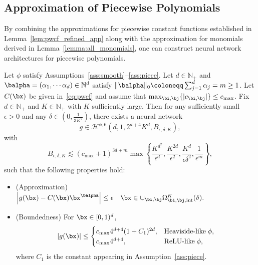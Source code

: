 \documentclass[11pt]{article}
\begin{document}
\subsection{Approximation of Piecewise Polynomials}
\label{subsec:piecewise-monomials}
By combining the approximations for piecewise constant functions established in Lemma~\ref{lem:pwcf_refined_app}  along with the approximation for monomials derived in Lemma~\ref{lemma:all_monomials}, one can construct neural network architectures for piecewise polynomials.
\begin{lemma}
    Let $\phi$ satisfy Assumptions~\ref{ass:smooth}--\ref{ass:piece}. Let $d \in \mathbb{N}_{+}$ and $\balpha = (\alpha_1, \cdots \alpha_d) \in \mathbb{N}^d$ satisfy $\|\balpha\|_0 \coloneqq  \sum_{j=1}^{d} \alpha_j = m \ge 1$. Let $C(\bx)$ be given in~\eqref{eq:pwcf} and assume that $\max_{\bi, \bj} \{|c_{\bi,\bj}|\} \leq c_{\max}$. Fix $d\in\mathbb{N}_{+}$ and $K\in\mathbb{N}_{+}$ with $K$ sufficiently large.
    Then for any sufficiently small $\epsilon>0$ and any $\delta \in (0, \frac{1}{3K^2})$, there exists a neural network 
    \begin{equation*}
        g \in \mathcal{H}^{\phi,6}(d, 1, 2^{d+4}K^d, B_{\epsilon,\delta, K}),
    \end{equation*}
    with 
    \begin{equation}
        B_{\epsilon,\delta, K} \lesssim (c_{\max}+ 1)^{3d+m} \max \left\{ \frac{K^{d^2}}{\epsilon^d}, \frac{K^{2d}}{\epsilon^{2}}, \frac{K^d}{\epsilon \delta^2}, \frac{1}{\epsilon^m} \right\},
        \label{eq:norm_piece_poly}
    \end{equation}
    such that the following properties hold:
    \begin{itemize}
        \item (Approximation) $\left| g(\bx) - C(\bx) \bx^{\balpha}\right| \leq \epsilon \quad \bx \in \cup_{\bi,\bj} \Omega^K_{\bi, \bj, \mathrm{int}}(\delta).$
        \item (Boundedness) For $\bx \in [0,1)^d$,
        \begin{equation*}
            |g(\bx)| \le \begin{cases}
                c_{\max}4^{d+4} (1+ C_1)^{2d}, &   \textrm{Heaviside-like} \; \phi ,\\
                c_{\max}4^{d+4}, &  \textrm{ReLU-like} \; \phi,
            \end{cases}   
        \end{equation*}
        where $C_1$ is the constant appearing in Assumption~\ref{ass:piece}.
    \end{itemize}
    \label{lem:app_for_piece_poly}
\end{lemma}
\end{document}
